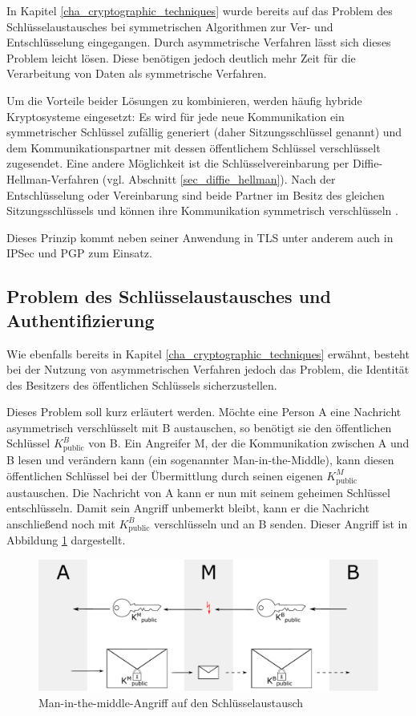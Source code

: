 In Kapitel \ref{cha_cryptographic_techniques} wurde bereits auf das Problem des Schlüsselaustausches bei symmetrischen Algorithmen zur Ver- und Entschlüsselung eingegangen. Durch asymmetrische Verfahren lässt sich dieses Problem leicht lösen. Diese benötigen jedoch deutlich mehr Zeit für die Verarbeitung von Daten als symmetrische Verfahren. 

Um die Vorteile beider Lösungen zu kombinieren, werden häufig hybride Kryptosysteme eingesetzt: Es wird für jede neue Kommunikation ein symmetrischer Schlüssel zufällig generiert (daher Sitzungsschlüssel genannt) und dem Kommunikationspartner mit dessen öffentlichem Schlüssel verschlüsselt zugesendet. Eine andere Möglichkeit ist die Schlüsselvereinbarung per Diffie-Hellman-Verfahren (vgl. Abschnitt \ref{sec_diffie_hellman}). Nach der Entschlüsselung oder Vereinbarung sind beide Partner im Besitz des gleichen Sitzungsschlüssels und können ihre Kommunikation symmetrisch verschlüsseln \cite{Schneier2006}.

Dieses Prinzip kommt neben seiner Anwendung in TLS unter anderem auch in IPSec und PGP zum Einsatz.

\subsection{Problem des Schlüsselaustausches und Authentifizierung}

Wie ebenfalls bereits in Kapitel \ref{cha_cryptographic_techniques} erwähnt, besteht bei der Nutzung von asymmetrischen Verfahren jedoch das Problem, die Identität des Besitzers des öffentlichen Schlüssels sicherzustellen.

Dieses Problem soll kurz erläutert werden. Möchte eine Person A eine Nachricht asymmetrisch verschlüsselt mit B austauschen, so benötigt sie den öffentlichen Schlüssel \(K^B_\text{public}\) von B. Ein Angreifer M, der die Kommunikation zwischen A und B lesen und verändern kann (ein sogenannter Man-in-the-Middle), kann diesen öffentlichen Schlüssel bei der Übermittlung durch seinen eigenen \(K^M_\text{public}\) austauschen. Die Nachricht von A kann er nun mit seinem geheimen Schlüssel entschlüsseln. Damit sein Angriff unbemerkt bleibt, kann er die Nachricht anschließend noch mit \(K^B_\text{public}\) verschlüsseln und an B senden. Dieser Angriff ist in Abbildung \ref{fig_mitm} dargestellt.

\begin{figure}
	\centering
	\includegraphics[width=15cm]{Diagrams/mitm.pdf} %
	\caption{Man-in-the-middle-Angriff auf den Schlüsselaustausch}
	\label{fig_mitm}
\end{figure}

